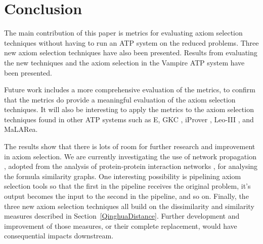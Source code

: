 \documentclass[EPiC]{easychair}
\begin{document}
\section{Conclusion}
\label{Conclusion}

The main contribution of this paper is metrics for evaluating axiom selection 
techniques without having to run an ATP system on the reduced problems.
Three new axiom selection techniques have also been presented.
Results from evaluating the new techniques and the axiom selection in the 
Vampire ATP system have been presented.

Future work includes a more comprehensive evaluation of the metrics, to
confirm that the metrics do provide a meaningful evaluation of the axiom
selection techniques.
It will also be interesting to apply the metrics to the axiom selection
techniques found in other ATP systems such as E, GKC \cite{Tam19},
iProver \cite{Kor08}, Leo-III \cite{SB18}, and MaLARea.

The results show that there is lots of room for further research and 
improvement in axiom selection.
We are currently investigating the use of network propagation \cite{SY07}, 
adopted from the analysis of protein-protein interaction networks
\cite{DD+20}, for analysing the formula similarity graphs.  
One interesting possibility is pipelining axiom selection tools so that
the first in the pipeline receives the original problem, it's output
becomes the input to the second in the pipeline, and so on.
Finally, the three new axiom selection techniques all build on the
dissimilarity and similarity measures described in 
Section~\ref{QinghuaDistance}.
Further development and improvement of those measures, or their complete
replacement, would have consequential impacts downstream.

\label{sect:bib}


\end{document}
